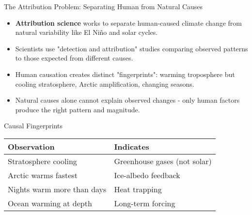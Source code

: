 \documentclass{beamer}
\begin{document}
	\begin{frame}{The Attribution Problem: Separating Human from Natural Causes}
		\begin{itemize}
			\item \textbf{Attribution science} works to separate human-caused climate change from natural variability like El Niño and solar cycles.
			\item Scientists use "detection and attribution" studies comparing observed patterns to those expected from different causes.
			\item Human causation creates distinct "fingerprints": warming troposphere but cooling stratosphere, Arctic amplification, changing seasons.
			\item Natural causes alone cannot explain observed changes - only human factors produce the right pattern and magnitude.
		\end{itemize}
		
		\begin{block}{Causal Fingerprints}
			\begin{tabular}{l|l}
				\textbf{Observation} & \textbf{Indicates} \\
				\hline
				Stratosphere cooling & Greenhouse gases (not solar) \\
				Arctic warms fastest & Ice-albedo feedback \\
				Nights warm more than days & Heat trapping \\
				Ocean warming at depth & Long-term forcing \\
			\end{tabular}
		\end{block}
	\end{frame}
	
\end{document}
